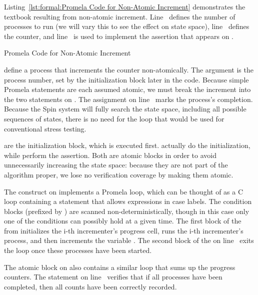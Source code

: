 \begin{fcvref}
Listing~\ref{lst:formal:Promela Code for Non-Atomic Increment}
demonstrates the textbook 
resulting from non-atomic increment.
Line~ defines the number of processes to run (we will vary this
to see the effect on state space), line~ defines the counter,
and line~ is used to implement the assertion that appears on
.

\begin{listing}

\caption{Promela Code for Non-Atomic Increment}
\label{lst:formal:Promela Code for Non-Atomic Increment}
\end{listing}

 define a process that increments
the counter non-atomically.
The argument  is the process number, set by the initialization
block later in the code.
Because simple Promela statements are each assumed atomic, we must
break the increment into the two statements on
.
The assignment on line~ marks the process's completion.
Because the Spin system will fully search the state space, including
all possible sequences of states, there is no need for the loop
that would be used for conventional stress testing.

 are the initialization block,
which is executed first.
 actually do the initialization,
while 
perform the assertion.
Both are atomic blocks in order to avoid unnecessarily increasing
the state space: because they are not part of the algorithm proper,
we lose no verification coverage by making them atomic.

The  construct on 
implements a Promela loop,
which can be thought of as a C  loop containing a
 statement that allows expressions in case labels.
The condition blocks (prefixed by \co{::})
are scanned non-deterministically,
though in this case only one of the conditions can possibly hold at a given
time.
The first block of the  from
initializes the i-th
incrementer's progress cell, runs the i-th incrementer's process, and
then increments the variable .
The second block of the  on
line~ exits the loop once
these processes have been started.

The atomic block on  also contains
a similar 
loop that sums up the progress counters.
The  statement on line~ verifies that
if all processes
have been completed, then all counts have been correctly recorded.
\end{fcvref}


